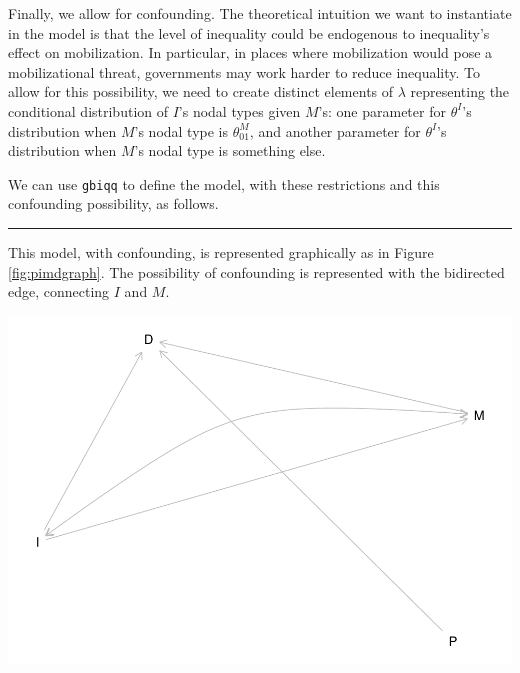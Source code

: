 \documentclass[12pt,]{book}
\newenvironment{Shaded}{\begin{snugshade}}{\end{snugshade}}
\newcommand{\CommentTok}[1]{\textcolor[rgb]{0.56,0.35,0.01}{\textit{#1}}}
\newcommand{\DataTypeTok}[1]{\textcolor[rgb]{0.13,0.29,0.53}{#1}}
\newcommand{\KeywordTok}[1]{\textcolor[rgb]{0.13,0.29,0.53}{\textbf{#1}}}
\newcommand{\NormalTok}[1]{#1}
\newcommand{\OperatorTok}[1]{\textcolor[rgb]{0.81,0.36,0.00}{\textbf{#1}}}
\newcommand{\StringTok}[1]{\textcolor[rgb]{0.31,0.60,0.02}{#1}}
\begin{document}
Finally, we allow for confounding. The theoretical intuition we want to instantiate in the model is that the level of inequality could be endogenous to inequality's effect on mobilization. In particular, in places where mobilization would pose a mobilizational threat, governments may work harder to reduce inequality. To allow for this possibility, we need to create distinct elements of \(\lambda\) representing the conditional distribution of \(I\)'s nodal types given \(M\)'s: one parameter for \(\theta^I\)'s distribution when \(M\)'s nodal type is \(\theta^M_{01}\), and another parameter for \(\theta^I\)'s distribution when \(M\)'s nodal type is something else.

We can use \texttt{gbiqq} to define the model, with these restrictions and this confounding possibility, as follows.

\begin{Shaded}
\end{Shaded}

\begin{center}\rule{0.5\linewidth}{\linethickness}\end{center}

This model, with confounding, is represented graphically as in Figure \ref{fig:pimdgraph}. The possibility of confounding is represented with the bidirected edge, connecting \(I\) and \(M\).

\includegraphics{ii_files/figure-latex/pimdgraph-1.pdf}
\end{document}
